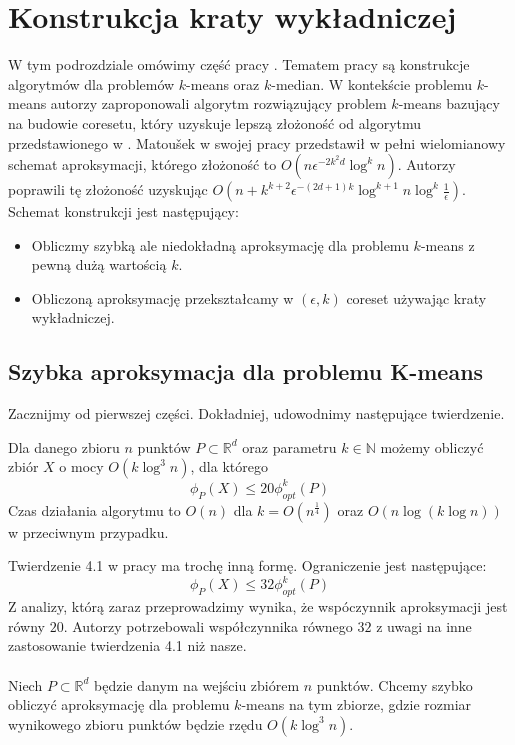 \section{Konstrukcja kraty wykładniczej}

W tym podrozdziale omówimy część pracy \cite{10.1145/1007352.1007400}.
Tematem pracy są konstrukcje algorytmów dla problemów $k$-means oraz $k$-median.
W kontekście problemu $k$-means autorzy zaproponowali algorytm rozwiązujący problem $k$-means bazujący na budowie coresetu, który uzyskuje lepszą złożoność od algorytmu przedstawionego w \cite{Matousek99onapproximate}.
Matoušek w swojej pracy \cite{Matousek99onapproximate} przedstawił w pełni wielomianowy schemat aproksymacji, którego złożoność to $O(n\epsilon^{-2k^2d}\log^kn)$.
Autorzy \cite{10.1145/1007352.1007400} poprawili tę złożoność uzyskując $O(n+k^{k+2}\epsilon^{-(2d+1)k}\log^{k+1}n \log^k\frac{1}{\epsilon})$.
Schemat konstrukcji jest następujący:
\begin{itemize}
    \item Obliczmy szybką ale niedokładną aproksymację dla problemu $k$-means z pewną dużą wartością $k$.
    \item Obliczoną aproksymację przekształcamy w $(\epsilon, k)$ coreset używając kraty wykładniczej.
\end{itemize}


\subsection{Szybka aproksymacja dla problemu K-means}
\noindent
Zacznijmy od pierwszej części.
Dokładniej, udowodnimy następujące twierdzenie.

\begin{thm}{\cite{10.1145/1007352.1007400}}
    Dla danego zbioru $n$ punktów $P \subset \mathbb{R}^d$ oraz parametru $k \in \mathbb{N}$ możemy 
    obliczyć zbiór $X$ o mocy $O(k \log^{3}n)$, dla którego 
    \begin{equation}
        \phi_{P}(X) \leq 20 \phi_{opt}^{k}(P)
    \end{equation}
    Czas działania algorytmu to $O(n)$ dla $k = O(n^{\frac{1}{4}})$ oraz $O(n \log (k \log n))$ w przeciwnym przypadku.
\end{thm}

\noindent
Twierdzenie 4.1 w pracy \cite{10.1145/1007352.1007400} ma trochę inną formę.
Ograniczenie jest następujące:
\begin{equation}
    \phi_{P}(X) \leq 32 \phi_{opt}^{k}(P)
\end{equation}
Z analizy, którą zaraz przeprowadzimy wynika, że wspóczynnik aproksymacji jest równy $20$.
Autorzy potrzebowali współczynnika równego $32$ z uwagi na inne zastosowanie twierdzenia 4.1 niż nasze.
\\~\\
Niech $P \subset \mathbb{R}^{d}$ będzie danym na wejściu zbiórem $n$ punktów.
Chcemy szybko obliczyć aproksymację dla problemu $k$-means na tym zbiorze, gdzie rozmiar wynikowego zbioru punktów będzie rzędu $O(k \log^{3}n)$.

